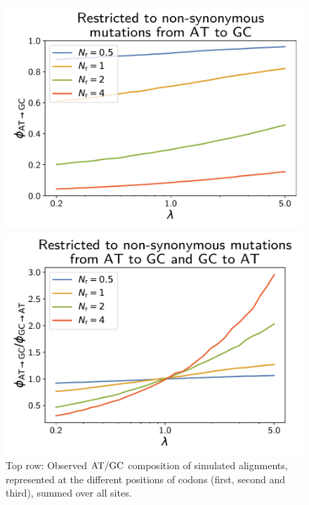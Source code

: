 \documentclass{article}
\begin{document}
\begin{figure}[h]
\begin{minipage}{0.32\linewidth}
 \includegraphics[width=\linewidth, page=1]{simulations/omega_WS}
 \end{minipage}
 \hfill
 \begin{minipage}{0.32\linewidth}
 \includegraphics[width=\linewidth, page=1]{simulations/omega_WS_over_SW}
 \end{minipage}
 \hfill
 \caption[$\atgc$ composition of the alignment]{
 Top row:
 Observed $\atgc$ composition of simulated alignments, represented at the different positions of codons (first, second and third), summed over all sites.
}
\end{figure}
\end{document}
